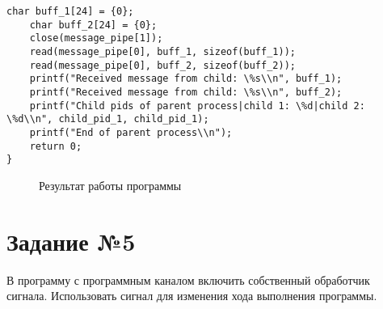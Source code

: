 \begin{lstlisting}[label=task_4,caption=Код к заданию №4]
    char buff_1[24] = {0};
    char buff_2[24] = {0};
    close(message_pipe[1]);
    read(message_pipe[0], buff_1, sizeof(buff_1));
    read(message_pipe[0], buff_2, sizeof(buff_2));
    printf("Received message from child: \%s\\n", buff_1);
    printf("Received message from child: \%s\\n", buff_2);
    printf("Child pids of parent process|child 1: \%d|child 2: \%d\\n", child_pid_1, child_pid_1);
    printf("End of parent process\\n");
    return 0;
}
\end{lstlisting}

\begin{figure}[ph!]
	\caption{Результат работы программы}
\end{figure}

\section{Задание №5}
В программу с программным каналом включить собственный обработчик сигнала. Использовать сигнал для изменения хода выполнения программы.

